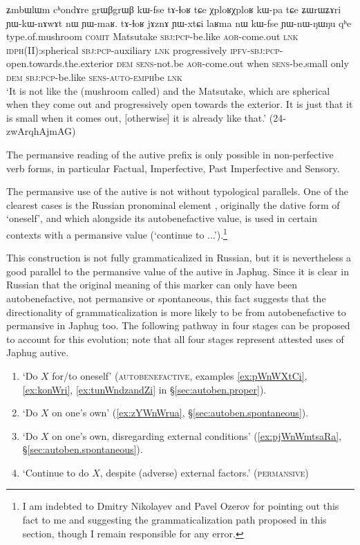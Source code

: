 \begin{exe}
 \ex \label{ex:YWnWNWNu}
 \gll ʑmbɯlɯm cʰondɤre grɯβgrɯβ kɯ-fse tɤ-ɬoʁ tɕe χploʁχploʁ kɯ-pa tɕe ʑɯrɯʑɤri ɲɯ-kɯ-nɤwɤt nɯ ɲɯ-maʁ. tɤ-ɬoʁ jɤznɤ ɲɯ-xtɕi laʁma nɯ kɯ-fse ɲɯ-nɯ-ŋɯ\redp{}ŋu qʰe\\
type.of.mushroom \textsc{comit} Matsutake \textsc{sbj}:\textsc{pcp}-be.like \textsc{aor}-come.out \textsc{lnk} \textsc{idph(II):}spherical \textsc{sbj}:\textsc{pcp}-auxiliary \textsc{lnk} progressively \textsc{ipfv}-\textsc{sbj}:\textsc{pcp}-open.towards.the.exterior \textsc{dem} \textsc{sens}-not.be  \textsc{aor}-come.out when \textsc{sens}-be.small only \textsc{dem} \textsc{sbj}:\textsc{pcp}-be.like \textsc{sens}-\textsc{auto}-\textsc{emph}\redp{}be \textsc{lnk}\\
\glt `It is not like the (mushroom called)  and the Matsutake, which are spherical when they come out and progressively open towards the exterior. It is just that it is small when it comes out, [otherwise] it is already like that.'  (24-zwArqhAjmAG)
 \end{exe}
 
The permansive reading of the autive prefix is only possible in non-perfective verb forms, in particular Factual, Imperfective, Past Imperfective and Sensory.

The permansive use of the autive  is not without typological parallels. One of the clearest cases is the Russian pronominal element , originally the dative form of  `oneself', and which alongside its autobenefactive value,  is used in certain contexts with a permansive value (`continue to ...').\footnote{I am indebted to Dmitry Nikolayev and Pavel Ozerov for pointing out this fact to me and suggesting the grammaticalization path proposed in this section, though I remain responsible for any error.}
 
This construction is not fully grammaticalized in Russian, but it is nevertheless a good parallel to the permansive value of the autive in Japhug. Since it is clear in Russian that the original meaning of this marker can only have been autobenefactive, not permansive or spontaneous, this fact suggests that the directionality of grammaticalization is more likely to be from autobenefactive to permansive in Japhug too. The following pathway in four stages can be proposed to account for this evolution; note that all four stages represent attested uses of Japhug autive.
\largerpage
\begin{enumerate}
\item `Do $X$ for/to oneself' (\textsc{autobenefactive}, examples \ref{ex:pWnWXtCi}, \ref{ex:konWri}, \ref{ex:tunWndzandZi} in §\ref{sec:autoben.proper}).  
\item `Do $X$ on one's own' (\ref{ex:zYWnWrua}, §\ref{sec:autoben.spontaneous}).
\item `Do $X$ on one's own, disregarding external conditions' (\ref{ex:pjWnWmtsaRa}, §\ref{sec:autoben.spontaneous}).
\item `Continue to do $X$, despite (adverse) external factors.' (\textsc{permansive})
\end{enumerate}
 
